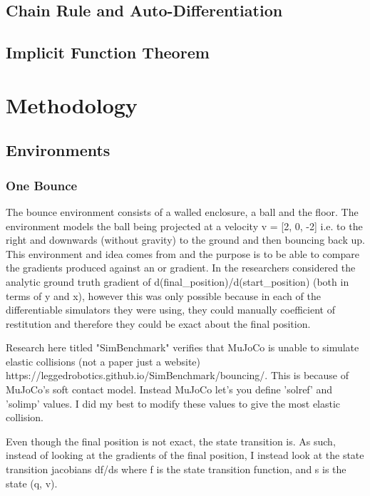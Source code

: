 \documentclass[logo,bsc,singlespacing,parskip]{infthesis}
\begin{document}
\section {Chain Rule and Auto-Differentiation}

\section {Implicit Function Theorem}

\chapter{Methodology}

\section*{Environments}

\subsection*{One Bounce}

The bounce environment consists of a walled enclosure, a ball and the floor.
The environment models the ball being projected at a velocity
v = [2, 0, -2] i.e. to the right and downwards (without gravity) to the ground and then bouncing back up.
This environment and idea comes from \citet{Suh2022DoGradients} and the purpose is to be able to compare
the gradients produced against an  or  gradient.
In \citet{Suh2022DoGradients} the researchers considered the analytic ground truth gradient of
d(final_position)/d(start_position) (both in terms of y and x),
however this was only possible because in each of the differentiable simulators they were using, they
could manually coefficient of restitution and therefore they could be exact about the final position.

Research here titled "SimBenchmark" verifies that MuJoCo is unable to simulate elastic collisions
(not a paper just a website) {https://leggedrobotics.github.io/SimBenchmark/bouncing/}.
This is because of MuJoCo's soft contact model. Instead MuJoCo let's you define 'solref' and 'solimp' values.
I did my best to modify these values to give the most elastic collision.

Even though the final position is not exact, the state transition is.
As such, instead of looking at the gradients of the final position, I instead look at the state transition jacobians
df/ds where f is the state transition function, and s is the state (q, v).
\end{document}
